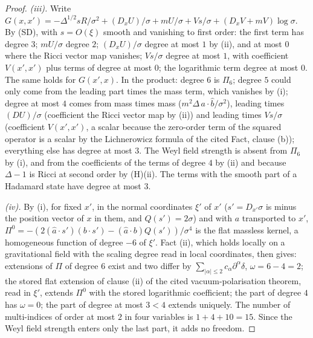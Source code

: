 \begin{proof}
\emph{(iii).} Write $G(x, x') = -\Delta^{1/2}sR/\sigma^{2} + (D_{x}U)/\sigma + mU/\sigma + Vs/\sigma + (D_{x}V + mV)\log\sigma$. By (SD), with $s = O(\xi)$ smooth and vanishing to first order: the first term has degree $3$; $mU/\sigma$ degree $2$; $(D_{x}U)/\sigma$ degree at most $1$ by (ii), and at most $0$ where the Ricci vector map vanishes; $Vs/\sigma$ degree at most $1$, with coefficient $V(x', x')$ plus terms of degree at most $0$; the logarithmic term degree at most $0$. The same holds for $G(x', x)$. In the product: degree $6$ is $\Pi_{6}$; degree $5$ could only come from the leading part times the mass term, which vanishes by (i); degree at most $4$ comes from mass times mass ($m^{2}\Delta\,a\cdot\hat b/\sigma^{2}$), leading times $(D U)/\sigma$ (coefficient the Ricci vector map by (ii)) and leading times $Vs/\sigma$ (coefficient $V(x', x')$, a scalar because the zero-order term of the squared operator is a scalar by the Lichnerowicz formula of the cited Fact, clause (b)); everything else has degree at most $3$. The Weyl field strength is absent from $\Pi_{6}$ by (i), and from the coefficients of the terms of degree $4$ by (ii) and because $\Delta - 1$ is Ricci at second order by (H)(ii). The terms with the smooth part of a Hadamard state have degree at most $3$.

\emph{(iv).} By (i), for fixed $x'$, in the normal coordinates $\xi'$ of $x'$ ($s' = D_{x'}\sigma$ is minus the position vector of $x$ in them, and $Q(s') = 2\sigma$) and with $a$ transported to $x'$, $\Pi^{0} = -(2(\hat a\cdot s')(b\cdot s') - (\hat a\cdot b)Q(s'))/\sigma^{4}$ is the flat massless kernel, a homogeneous function of degree $-6$ of $\xi'$. Fact (ii), which holds locally on a gravitational field with the scaling degree read in local coordinates, then gives: extensions of $\Pi$ of degree $6$ exist and two differ by $\sum_{|\alpha| \le 2}c_{\alpha}\partial^{\alpha}\delta$, $\omega = 6 - 4 = 2$; the stored flat extension of clause (ii) of the cited vacuum-polarisation theorem, read in $\xi'$, extends $\Pi^{0}$ with the stored logarithmic coefficient; the part of degree $4$ has $\omega = 0$; the part of degree at most $3 < 4$ extends uniquely. The number of multi-indices of order at most $2$ in four variables is $1 + 4 + 10 = 15$. Since the Weyl field strength enters only the last part, it adds no freedom.
\end{proof}
